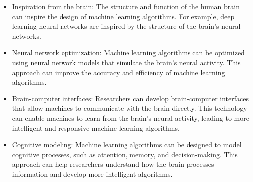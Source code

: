 \documentclass[letterpaper,11pt]{article}
\begin{document}
\begin{itemize}
  \item Inspiration from the brain: The structure and function of the human brain can inspire the design of machine learning algorithms. For example, deep learning neural networks are inspired by the structure of the brain's neural networks.
  \item Neural network optimization: Machine learning algorithms can be optimized using neural network models that simulate the brain's neural activity. This approach can improve the accuracy and efficiency of machine learning algorithms.
  \item Brain-computer interfaces: Researchers can develop brain-computer interfaces that allow machines to communicate with the brain directly. This technology can enable machines to learn from the brain's neural activity, leading to more intelligent and responsive machine learning algorithms.
  \item Cognitive modeling: Machine learning algorithms can be designed to model cognitive processes, such as attention, memory, and decision-making. This approach can help researchers understand how the brain processes information and develop more intelligent algorithms.
\end{itemize}
\end{document}

